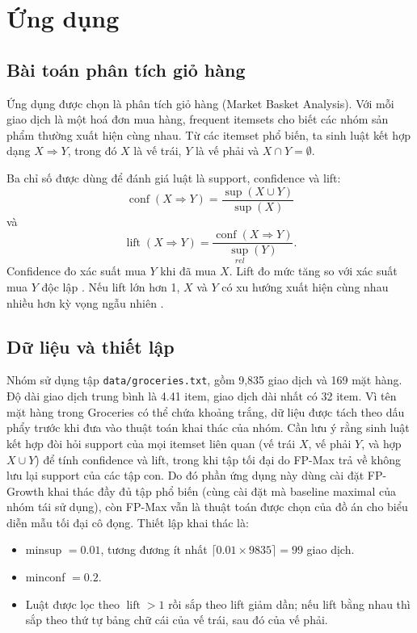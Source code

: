 \section{Ứng dụng}
\label{sec:application}

\subsection{Bài toán phân tích giỏ hàng}

Ứng dụng được chọn là phân tích giỏ hàng (Market Basket Analysis). Với mỗi giao dịch là một hoá đơn mua hàng, frequent itemsets cho biết các nhóm sản phẩm thường xuất hiện cùng nhau. Từ các itemset phổ biến, ta sinh luật kết hợp dạng $X \Rightarrow Y$, trong đó $X$ là vế trái, $Y$ là vế phải và $X \cap Y = \emptyset$.

Ba chỉ số được dùng để đánh giá luật là support, confidence và lift:
\[
    \operatorname{conf}(X \Rightarrow Y) =
    \frac{\operatorname{sup}(X \cup Y)}{\operatorname{sup}(X)}
\]
và
\[
    \operatorname{lift}(X \Rightarrow Y) =
    \frac{\operatorname{conf}(X \Rightarrow Y)}{\operatorname{sup}_{rel}(Y)}.
\]
Confidence đo xác suất mua $Y$ khi đã mua $X$. Lift đo mức tăng so với xác suất mua $Y$ độc lập \cite{Brin1997Implication}. Nếu lift lớn hơn 1, $X$ và $Y$ có xu hướng xuất hiện cùng nhau nhiều hơn kỳ vọng ngẫu nhiên \cite{Agrawal1993AssociationRules}.

\subsection{Dữ liệu và thiết lập}

Nhóm sử dụng tập \texttt{data/groceries.txt}, gồm 9,835 giao dịch và 169 mặt hàng. Độ dài giao dịch trung bình là 4.41 item, giao dịch dài nhất có 32 item. Vì tên mặt hàng trong Groceries có thể chứa khoảng trắng, dữ liệu được tách theo dấu phẩy trước khi đưa vào thuật toán khai thác của nhóm. Cần lưu ý rằng sinh luật kết hợp đòi hỏi support của mọi itemset liên quan (vế trái $X$, vế phải $Y$, và hợp $X\cup Y$) để tính confidence và lift, trong khi tập tối đại do FP-Max trả về không lưu lại support của các tập con. Do đó phần ứng dụng này dùng cài đặt FP-Growth khai thác đầy đủ tập phổ biến (cùng cài đặt mà baseline maximal của nhóm tái sử dụng), còn FP-Max vẫn là thuật toán được chọn của đồ án cho biểu diễn mẫu tối đại cô đọng. Thiết lập khai thác là:

\begin{itemize}
    \item minsup $= 0.01$, tương đương ít nhất $\lceil 0.01 \times 9835 \rceil = 99$ giao dịch.
    \item minconf $= 0.2$.
    \item Luật được lọc theo $\operatorname{lift} > 1$ rồi sắp theo lift giảm dần; nếu lift bằng nhau thì sắp theo thứ tự bảng chữ cái của vế trái, sau đó của vế phải.
\end{itemize}

